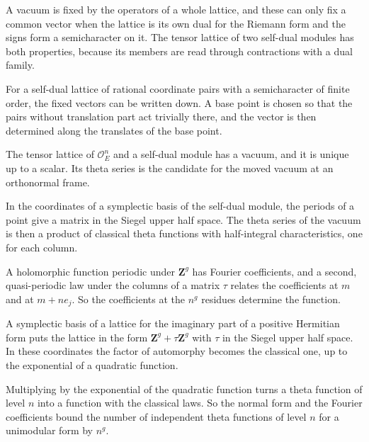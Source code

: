 A vacuum is fixed by the operators of a whole lattice, and these can only fix a common vector when the lattice
is its own dual for the Riemann form and the signs form a semicharacter on it. The tensor lattice of two
self-dual modules has both properties, because its members are read through contractions with a dual family.

For a self-dual lattice of rational coordinate pairs with a semicharacter of finite order, the fixed vectors
can be written down. A base point is chosen so that the pairs without translation part act trivially there,
and the vector is then determined along the translates of the base point.

The tensor lattice of $\mathcal O_E^n$ and a self-dual module has a vacuum, and it is unique up to a
scalar. Its theta series is the candidate for the moved vacuum at an orthonormal frame.

In the coordinates of a symplectic basis of the self-dual module, the periods of a point give a matrix in the Siegel
upper half space. The theta series of the vacuum is then a product of classical theta functions with half-integral
characteristics, one for each column.

A holomorphic function periodic under $\mathbf Z^g$ has Fourier coefficients, and a second, quasi-periodic law under
the columns of a matrix $\tau$ relates the coefficients at $m$ and at $m+ne_j$. So the coefficients at the $n^g$
residues determine the function.

A symplectic basis of a lattice for the imaginary part of a positive Hermitian form puts the lattice in the form
$\mathbf Z^g+\tau\mathbf Z^g$ with $\tau$ in the Siegel upper half space. In these coordinates the factor of automorphy
becomes the classical one, up to the exponential of a quadratic function.

Multiplying by the exponential of the quadratic function turns a theta function of level $n$ into a function with the
classical laws. So the normal form and the Fourier coefficients bound the number of independent theta functions of
level $n$ for a unimodular form by $n^g$.

